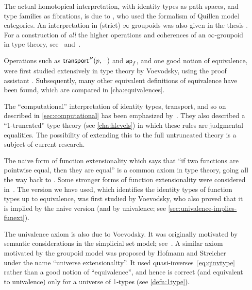 The actual homotopical interpretation, with identity types as path spaces, and type families as fibrations, is due to \cite{AW}, who used the formalism of Quillen model categories.  An interpretation in (strict) $\infty$-groupoids was also given in the thesis \cite{mw:thesis}.
For a construction of \emph{all} the higher operations and coherences of an $\infty$-groupoid in type theory, see~\cite{pll:wkom-type} and~\cite{bg:type-wkom}.

%
Operations such as $\mathsf{transport}^{P}(p,\mathord{\hspace{1pt}\text{--}\hspace{1pt}})$ and $\mathsf{ap}_{f}$, and one good notion of equivalence, were first studied extensively in type theory by Voevodsky, using the proof assistant \Coq.
Subsequently, many other equivalent definitions of equivalence have been found, which are compared in \autoref{cha:equivalences}.

The ``computational'' interpretation of identity types, transport, and so on described in \autoref{sec:computational} has been emphasized by~\cite{lh:canonicity}.
They also described a ``1-truncated'' type theory (see \autoref{cha:hlevels}) in which these rules are judgmental equalities.
The possibility of extending this to the full untruncated theory is a subject of current research.

%
The naive form of function extensionality which says that ``if two functions are pointwise equal, then they are equal'' is a common axiom in type theory, going all the way back to \cite{PM2}.
Some stronger forms of function extensionality were considered in~\cite{garner:depprod}.
The version we have used, which identifies the identity types of function types up to equivalence, was first studied by Voevodsky, who also proved that it is implied by the naive version (and by univalence; see \autoref{sec:univalence-implies-funext}).

%
The univalence axiom is also due to Voevodsky.
It was originally motivated by semantic considerations in the simplicial set model; see~\cite{klv:ssetmodel}.
A similar axiom motivated by the groupoid model was proposed by Hofmann and Streicher~\cite{hs:gpd-typethy} under the name ``universe extensionality''.
It used quasi-inverses~\eqref{eq:qinvtype} rather than a good notion of ``equivalence'', and hence is correct (and equivalent to univalence) only for a universe of 1-types (see \autoref{defn:1type}).

